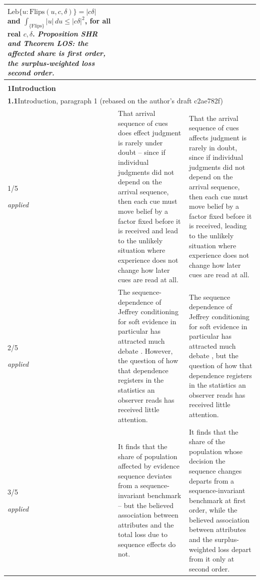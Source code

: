 \documentclass[10pt]{article}
\theoremstyle{definition}
\newcommand{\entryhead}[2]{\multicolumn{3}{|l|}{\rule{0pt}{2.6ex}\large\textbf{#1}\quad #2} \\ \hline}
\begin{document}
{\begin{longtable}{|p{0.9cm}|p{12.2cm}|p{12.2cm}|}
{$\mathrm{Leb}\{u : \mathrm{Flips}(u,c,\delta)\} = |c\delta|$ and
$\int_{\{\mathrm{Flips}\}} |u|\,du \le |c\delta|^2$, for all real $c,\delta$. \newline \textit{Proposition SHR and Theorem LOS: the affected share is first order,
the surplus-weighted loss second order.}} \\ \hline
\multicolumn{3}{|l|}{} \\ \hline
\multicolumn{3}{|l|}{\rule{0pt}{3.2ex}\Large\textbf{1\quad Introduction}} \\ \hline\hline
\entryhead{1.1}{Introduction, paragraph 1 (rebased on the author's draft c2ae782f)\quad{\footnotesize\textit{(formerly C.2)}}}
1/5 \par{\tiny\textit{applied}} & That arrival sequence of cues does effect judgment is rarely under doubt -- since if individual judgments did not depend on the arrival sequence, then each cue must move belief by a factor fixed before it is received and lead to the unlikely situation where experience does not change how later cues are read at all. & That the arrival sequence of cues affects judgment is rarely in doubt, since if individual judgments did not depend on the arrival sequence, then each cue must move belief by a factor fixed before it is received, leading to the unlikely situation where experience does not change how later cues are read at all. \\ \hline
2/5 \par{\tiny\textit{applied}} & The sequence-dependence of Jeffrey conditioning for soft evidence in particular has attracted much debate \citep{DiaconisZabell1982,Hawthorne2004}. However, the question of how that dependence registers in the statistics an observer reads has received little attention. & The sequence dependence of Jeffrey conditioning for soft evidence in particular has attracted much debate \citep{DiaconisZabell1982,Hawthorne2004}, but the question of how that dependence registers in the statistics an observer reads has received little attention. \\ \hline
3/5 \par{\tiny\textit{applied}} & It finds that the share of population affected by evidence sequence deviates from a sequence-invariant benchmark -- but the believed association between attributes and the total loss due to sequence effects do not. & It finds that the share of the population whose decision the sequence changes departs from a sequence-invariant benchmark at first order, while the believed association between attributes and the surplus-weighted loss depart from it only at second order. \\ \hline

\end{longtable}}
\end{document}
